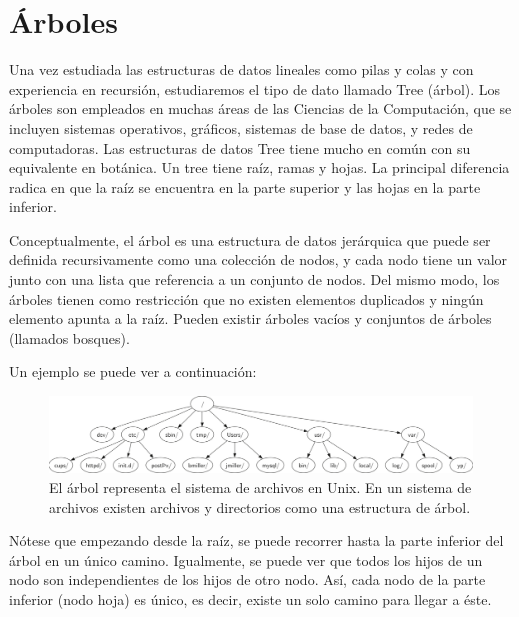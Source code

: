 \newpage
\part*{Árboles}
\setcounter{section}{0}

Una vez estudiada las estructuras de datos lineales como pilas y colas y con experiencia en recursión, estudiaremos el tipo de dato llamado Tree (árbol). Los árboles son empleados en muchas áreas de las Ciencias de la Computación, que se incluyen sistemas operativos, gráficos, sistemas de base de datos, y redes de computadoras. Las estructuras de datos Tree tiene mucho en común con su equivalente en botánica. Un tree tiene raíz, ramas y hojas. La principal diferencia radica en que la raíz se encuentra en la parte superior y las hojas en la parte inferior.

Conceptualmente, el árbol es una estructura de datos jerárquica que puede ser definida recursivamente como una colección de nodos, y cada nodo tiene un valor junto con una lista que referencia a un conjunto de nodos. Del mismo modo, los árboles tienen como restricción que no existen elementos duplicados y ningún elemento apunta a la raíz. Pueden existir árboles vacíos y conjuntos de árboles (llamados bosques).

Un ejemplo se puede ver a continuación:

\begin{figure}[htpb!]
  \begin{center}
    \includegraphics[width=1.0\textwidth]{images/extree1.png}
  \end{center}
  \caption{El árbol representa el sistema de archivos en Unix. En un sistema de archivos existen archivos y directorios como una estructura de árbol.}
  \label{fig:extree1}
\end{figure}

Nótese que empezando desde la raíz, se puede recorrer hasta la parte inferior del árbol en un único camino. Igualmente, se puede ver que todos los hijos de un nodo son independientes de los hijos de otro nodo. Así, cada nodo de la parte inferior (nodo hoja) es único, es decir, existe un solo camino para llegar a éste.

